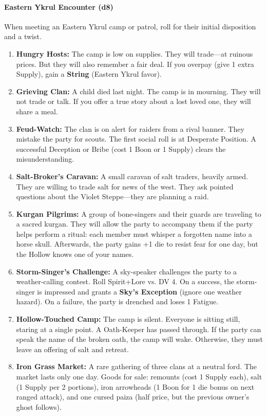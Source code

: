 \paragraph{Eastern Ykrul Encounter (d8)}
When meeting an Eastern Ykrul camp or patrol, roll for their initial disposition and a twist.
\begin{enumerate}
  \item \textbf{Hungry Hosts:} The camp is low on supplies. They will trade---at ruinous prices. But they will also remember a fair deal. If you overpay (give 1 extra Supply), gain a \textbf{String} (Eastern Ykrul favor).
  \item \textbf{Grieving Clan:} A child died last night. The camp is in mourning. They will not trade or talk. If you offer a true story about a lost loved one, they will share a meal.
  \item \textbf{Feud-Watch:} The clan is on alert for raiders from a rival banner. They mistake the party for scouts. The first social roll is at Desperate Position. A successful Deception or Bribe (cost 1 Boon or 1 Supply) clears the misunderstanding.
  \item \textbf{Salt-Broker's Caravan:} A small caravan of salt traders, heavily armed. They are willing to trade salt for news of the west. They ask pointed questions about the Violet Steppe---they are planning a raid.
  \item \textbf{Kurgan Pilgrims:} A group of bone-singers and their guards are traveling to a sacred kurgan. They will allow the party to accompany them if the party helps perform a ritual: each member must whisper a forgotten name into a horse skull. Afterwards, the party gains +1 die to resist fear for one day, but the Hollow knows one of your names.
  \item \textbf{Storm-Singer's Challenge:} A sky-speaker challenges the party to a weather-calling contest. Roll Spirit+Lore vs. DV 4. On a success, the storm-singer is impressed and grants a \textbf{Sky's Exception} (ignore one weather hazard). On a failure, the party is drenched and loses 1 Fatigue.
  \item \textbf{Hollow-Touched Camp:} The camp is silent. Everyone is sitting still, staring at a single point. A Oath-Keeper has passed through. If the party can speak the name of the broken oath, the camp will wake. Otherwise, they must leave an offering of salt and retreat.
  \item \textbf{Iron Grass Market:} A rare gathering of three clans at a neutral ford. The market lasts only one day. Goods for sale: remounts (cost 1 Supply each), salt (1 Supply per 2 portions), iron arrowheads (1 Boon for 1 die bonus on next ranged attack), and one cursed paiza (half price, but the previous owner's ghost follows).
\end{enumerate}

